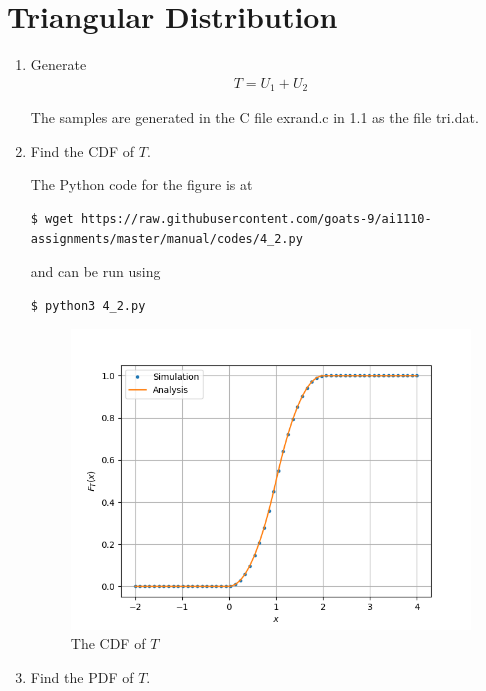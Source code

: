 \documentclass[journal,12pt,twocolumn]{IEEEtran}
\renewcommand\thesection{\arabic{section}}
\begin{document}
\section{Triangular Distribution}
\begin{enumerate}[label=\thesection.\arabic*
,ref=\thesection.\theenumi]
\item Generate
	\begin{align}
		T = U_1 + U_2
	\end{align}

\solution
The samples are generated in the C file exrand.c in 1.1 as the file tri.dat.

\item Find the CDF of $T$.

\solution
The Python code for the figure is at
\begin{lstlisting}
$ wget https://raw.githubusercontent.com/goats-9/ai1110-assignments/master/manual/codes/4_2.py
\end{lstlisting}
and can be run using
\begin{lstlisting}
$ python3 4_2.py
\end{lstlisting}
\begin{figure}[!htb]
	\includegraphics[width=\columnwidth]{figs/4_2.png}
	\caption{The CDF of $T$}
	\label{fig:tri-cdf}
\end{figure}
\item Find the PDF of $T$.
	\begin{figure}

\end{figure}
\end{enumerate}
\end{document}
